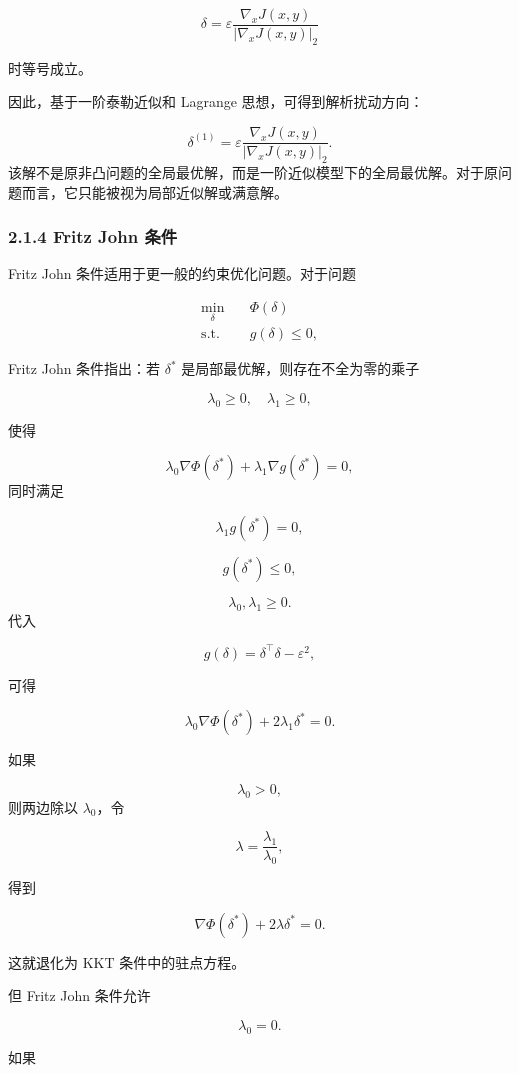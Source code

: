 ﻿\documentclass[UTF8,zihao=-4,fontset=none]{ctexart}
\begin{document}
\[
\delta
=
\varepsilon
\frac{\nabla_xJ(x,y)}{|\nabla_xJ(x,y)|_2}
\]

时等号成立。

因此，基于一阶泰勒近似和 Lagrange 思想，可得到解析扰动方向：

\[
\delta^{(1)}
=
\varepsilon
\frac{\nabla_xJ(x,y)}{|\nabla_xJ(x,y)|_2}.
\]
\noindent 该解不是原非凸问题的全局最优解，而是一阶近似模型下的全局最优解。对于原问题而言，它只能被视为局部近似解或满意解。

\subsubsection*{2.1.4 Fritz John 条件}
{}

Fritz John 条件适用于更一般的约束优化问题。对于问题

\[
\begin{aligned}
\min_{\delta}
\quad & \Phi(\delta)\\
\mathrm{s.t.}
\quad & g(\delta)\le 0,
\end{aligned}
\]

Fritz John 条件指出：若 \(\delta^*\) 是局部最优解，则存在不全为零的乘子

\[
\lambda_0\ge 0,\quad \lambda_1\ge 0,
\]

使得

\[
\lambda_0\nabla\Phi(\delta^*)
+
\lambda_1\nabla g(\delta^*)
=
0,
\]
\noindent 同时满足

\[
\lambda_1g(\delta^*)=0,
\]

\[
g(\delta^*)\le 0,
\]

\[
\lambda_0,\lambda_1\ge 0.
\]
\noindent 代入

\[
g(\delta)=\delta^\top\delta-\varepsilon^2,
\]

可得

\[
\lambda_0\nabla\Phi(\delta^*)
+
2\lambda_1\delta^*
=
0.
\]

如果

\[
\lambda_0>0,
\]
\noindent 则两边除以 \(\lambda_0\)，令

\[
\lambda=\frac{\lambda_1}{\lambda_0},
\]

得到

\[
\nabla\Phi(\delta^*)+2\lambda\delta^*=0.
\]

这就退化为 KKT 条件中的驻点方程。

但 Fritz John 条件允许

\[
\lambda_0=0.
\]

如果
\end{document}
